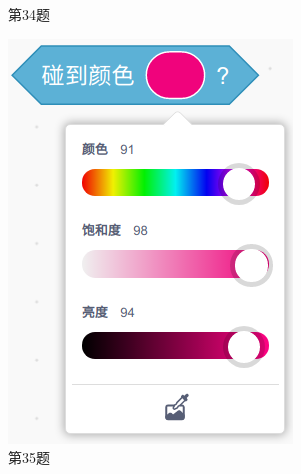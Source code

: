 \documentclass[10pt, a4paper]{article}
\begin{document}
\begin{enumerate}
\begin{figure}[htbp]
\begin{minipage}[t]{.18\textwidth}
                \caption*{第34题}
            \end{minipage}
            \begin{minipage}[t]{.15\textwidth}
                \centering
                \includegraphics[width=\textwidth]{35.png}
                \caption*{第35题}
            \end{minipage}
        \end{figure}
    \end{enumerate}
\end{document}
